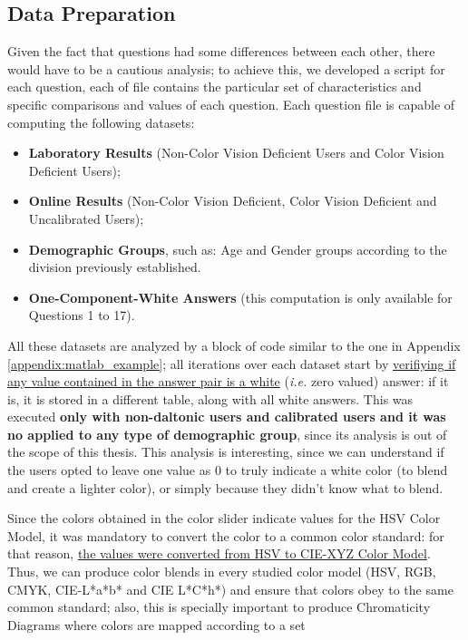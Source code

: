 \subsection{Data Preparation}
\label{subsec:results_preparation}
%
Given the fact that questions had some differences between each other, there would have to be a cautious analysis; to achieve this, we developed a script for each question, each of
file contains the particular set of characteristics and specific comparisons and values of each question. Each question file is capable of computing the following datasets:
%
\begin{itemize}[noitemsep]
  \item \textbf{Laboratory Results} (Non-Color Vision Deficient Users and Color Vision Deficient Users);
  \item \textbf{Online Results} (Non-Color Vision Deficient, Color Vision Deficient and Uncalibrated Users);
  \item \textbf{Demographic Groups}, such as: Age and Gender groups according to the division previously established.
  \item \textbf{One-Component-White Answers} (this computation is only available for Questions 1 to 17).
\end{itemize} \par
%
All these datasets are analyzed by a block of code similar to the one in Appendix \ref{appendix:matlab_example}; all iterations over each dataset start by \ul{verifiying if any value contained in
the answer pair is a white} (\emph{i.e.} zero valued) answer: if it is, it is stored in a different table, along with all white answers. This was executed \textbf{only
with non-daltonic users and calibrated users and it was no applied to any type of demographic group}, since its analysis is out of the scope of this thesis. This analysis is
interesting, since we can understand if the users opted to leave one value as 0 to truly indicate a white color (to blend and create a lighter color), or simply because they
didn't know what to blend. \par
%
Since the colors obtained in the color slider indicate values for the HSV Color Model, it was mandatory to convert the color to a common color standard: for that reason,
\ul{the values were converted from HSV to CIE-XYZ Color Model}. Thus, we can produce color blends in every studied color model (\gls{HSV}, \gls{RGB}, \gls{CMYK}, CIE-L*a*b* and
CIE L*C*h*) and ensure that colors obey to the same common standard; also, this is specially important to produce Chromaticity Diagrams where colors are mapped according to a set
